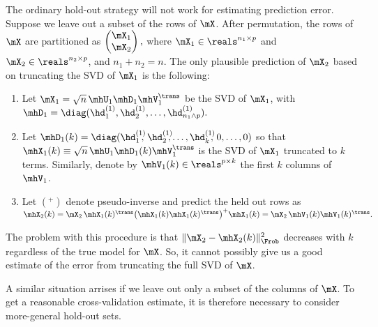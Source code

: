 The ordinary hold-out strategy will not work for estimating prediction error.  Suppose we leave out a subset of the rows of $\mX$.  After
permutation, the rows of $\mX$ are partitioned as
\(
    \left(
    \begin{matrix}
        \mX_1 \\
        \mX_2
    \end{matrix}
    \right),
\)
where $\mX_1 \in \reals^{n_1 \times p}$ and $\mX_2 \in \reals^{n_2 \times p}$,
and $n_1 + n_2 = n$.  The only plausible prediction of $\mX_2$ based on truncating the SVD of $\mX_1$ is the following:
\begin{enumerate}
    \item Let $\mX_1 = \sqrt{n} \, \mhU_1 \mhD_1 \mhV_1^\trans$ be the SVD of
        $\mX_1$, with 
        \(
            \mhD_1 
                = 
                \diag( 
                    \hd_1^{(1)}, 
                    \hd_2^{(1)}, 
                    \ldots, 
                    \hd_{n_1 \wedge p}^{(1)}
                ).
        \)
    \item Let 
        \(
            \mhD_1(k)
                =
                \diag(
                    \hd_1^{(1)}\!\!\!, \,
                    \hd_2^{(1)}\!\!\!, 
                    \ldots, 
                    \hd_k^{(1)}\!\!\!, \,
                    0,
                    \ldots,
                    0
                )
        \)
        so that
        $\mhX_1(k) \equiv \sqrt{n} \, \mhU_1 \mhD_1(k) \mhV_1^\trans$ is
        the SVD of $\mX_1$ truncated to $k$ terms.  Similarly, denote
        by $\mhV_1(k) \in \reals^{p \times k}$ the first $k$ columns of
        $\mhV_1$.
    \item Let $(^+)$ denote pseudo-inverse and predict the held out rows as
        \(
            \mhX_2(k) 
                = 
                    \mX_2 \,
                    \mhX_1(k)^\trans
                    \big(
                        \mhX_1(k) \mhX_1(k)^\trans
                    \big)^{+}
                    \mhX_1(k)
                =
                    \mX_2 \, \mhV_1(k) \mhV_1(k)^\trans.
        \)
\end{enumerate}
The problem with this procedure is that $\| \mX_2 - \mhX_2(k) \|_\Frob^2$ 
decreases with $k$ regardless of the true model for $\mX$.  So, it cannot
possibly give us a good estimate of the error from truncating the full
SVD of $\mX$.

A similar situation arrises if we leave out only a subset of the columns of
$\mX$.  To get a reasonable cross-validation estimate, it is therefore 
necessary to consider more-general hold-out sets.

